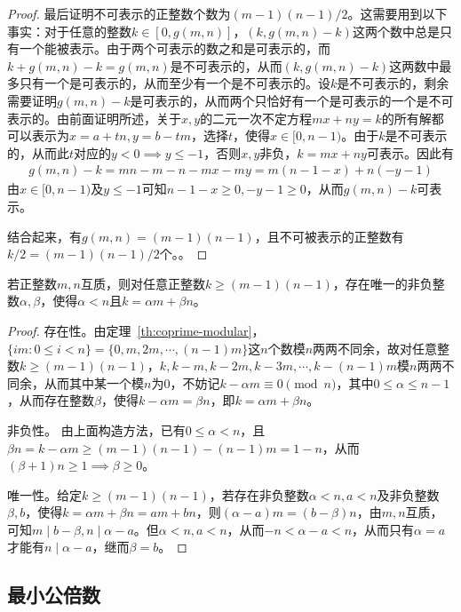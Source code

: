 \begin{proof}
  最后证明不可表示的正整数个数为$(m-1)(n-1)/2$。这需要用到以下事实：对于任意的整数$k\in[0,g(m,n)]$，$(k, g(m,n)-k)$这两个数中总是只有一个能被表示。由于两个可表示的数之和是可表示的，而$k + g(m,n)-k = g(m,n)$是不可表示的，从而$(k,g(m,n)-k)$这两数中最多只有一个是可表示的，从而至少有一个是不可表示的。设$k$是不可表示的，剩余需要证明$g(m,n)-k$是可表示的，从而两个只恰好有一个是可表示的一个是不可表示的。由前面证明所述，关于$x,y$的二元一次不定方程$mx+ny=k$的所有解都可以表示为$x=a+tn,y=b-tm$，选择$t$，使得$x\in[0,n-1)$。由于$k$是不可表示的，从而此$t$对应的$y<0\implies y\le-1$，否则$x,y$非负，$k=mx+ny$可表示。因此有
  \begin{align*}
    g(m,n)-k=mn-m-n-mx-my=m(n-1-x)+n(-y-1)
  \end{align*}
  由$x\in[0,n-1)$及$y\le -1$可知$n-1-x\ge0, -y-1\ge0$，从而$g(m,n)-k$可表示。

  结合起来，有$g(m,n)=(m-1)(n-1)$，且不可被表示的正整数有$k/2=(m-1)(n-1)/2$个。。
\end{proof}

\begin{theorem}\label{th:Skupien}
  若正整数$m,n$互质，则对任意正整数$k \ge (m-1)(n-1)$，存在唯一的非负整数$\alpha,\beta$，使得$\alpha < n$且$k =\alpha m + \beta n$。
\end{theorem}
\begin{proof}
  存在性。由定理~\ref{th:coprime-modular}，$\{im: 0\le i< n\}=\{0,m,2m,\cdots,(n-1)m\}$这$n$个数模$n$两两不同余，故对任意整数$k\ge (m-1)(n-1)$，$k,k-m,k-2m,k-3m,\cdots,k-(n-1)m$模$n$两两不同余，从而其中某一个模$n$为$0$，不妨记$k-\alpha m\equiv 0\pmod n$，其中$0\le \alpha \le n-1$，从而存在整数$\beta$，使得$k-\alpha m = \beta n$，即$k=\alpha m + \beta n$。

  非负性。
  由上面构造方法，已有$0\le\alpha<n$，且$\beta n = k-\alpha m\ge (m-1)(n-1)-(n-1)m=1-n$，从而$(\beta+1)n\ge1\implies\beta\ge0$。

  唯一性。给定$k\ge (m-1)(n-1)$，若存在非负整数$\alpha<n,a<n$及非负整数$\beta, b$，使得$k=\alpha m + \beta n = am + bn$，则$(\alpha -a)m=(b-\beta)n$，由$m,n$互质，可知$m\mid b-\beta, n\mid\alpha -a$。但$\alpha<n, a<n$，从而$-n<\alpha-a<n$，从而只有$\alpha = a$才能有$n\mid \alpha -a$，继而$\beta = b$。
\end{proof}

\subsection{最小公倍数}
\label{sec:lcm}

